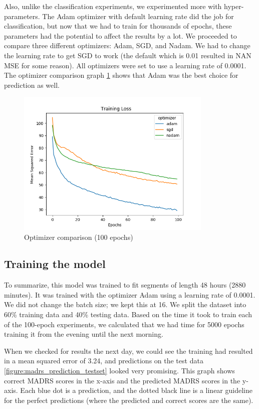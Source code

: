 Also, unlike the classification experiments, we experimented more with hyper-parameters. The Adam optimizer with default learning rate did the job for classification, 
but now that we had to train for thousands of epochs, these parameters had the potential to affect the results by a lot. 
We proceeded to compare three different optimizers: Adam, SGD, and Nadam. We had to change the learning rate to get SGD to work 
(the default which is 0.01 \cite{keras_docs_optimizers} resulted in NAN MSE for some reason). All optimizers were set to use a learning rate of 0.0001. 
The optimizer comparison graph \ref{figure:madrs_prediction_optimizers} shows that Adam was the best choice for prediction as well. 

\begin{figure}
      \includegraphics[height=7cm]{img/madrs_prediction/optimizers.png}
      \caption{Optimizer comparison (100 epochs)}
      \label{figure:madrs_prediction_optimizers}
\end{figure}

\subsection{Training the model}
To summarize, this model was trained to fit segments of length 48 hours (2880 minutes). It was trained with the optimizer Adam using a learning rate of 0.0001. 
We did not change the batch size; we kept this at 16. We split the dataset into 60\% training data and 40\% testing data. Based on the time it took to train 
each of the 100-epoch experiments, we calculated that we had time for 5000 epochs training it from the evening until the next morning. 

When we checked for results the next day, we could see the training had resulted in a mean squared error of 3.24, and predictions on the test data 
\ref{figure:madrs_prediction_testset} looked very promising. This graph shows correct MADRS scores in the x-axis and the predicted MADRS scores in the y-axis. 
Each blue dot is a prediction, and the dotted black line is a linear guideline for the perfect predictions (where the predicted and correct scores are the same). 

